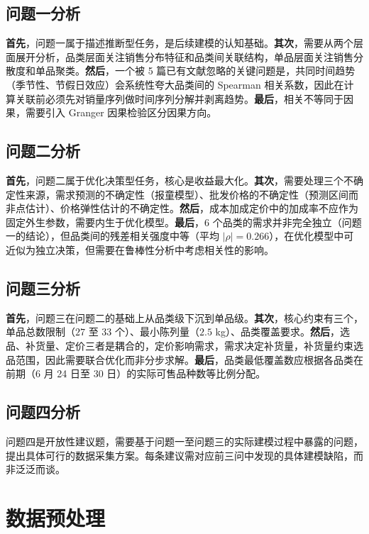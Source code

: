 \subsection{问题一分析}

\textbf{首先}，问题一属于描述推断型任务，是后续建模的认知基础。\textbf{其次}，需要从两个层面展开分析，品类层面关注销售分布特征和品类间关联结构，单品层面关注销售分散度和单品聚类。\textbf{然后}，一个被 5 篇已有文献忽略的关键问题是，共同时间趋势（季节性、节假日效应）会系统性夸大品类间的 Spearman 相关系数，因此在计算关联前必须先对销量序列做时间序列分解并剥离趋势。\textbf{最后}，相关不等同于因果，需要引入 Granger 因果检验区分因果方向。

\subsection{问题二分析}

\textbf{首先}，问题二属于优化决策型任务，核心是收益最大化。\textbf{其次}，需要处理三个不确定性来源，需求预测的不确定性（报童模型）、批发价格的不确定性（预测区间而非点估计）、价格弹性估计的不确定性。\textbf{然后}，成本加成定价中的加成率不应作为固定外生参数，需要内生于优化模型。\textbf{最后}，6 个品类的需求并非完全独立（问题一的结论），但品类间的残差相关强度中等（平均 $|\rho|=0.266$），在优化模型中可近似为独立决策，但需要在鲁棒性分析中考虑相关性的影响。

\subsection{问题三分析}

\textbf{首先}，问题三在问题二的基础上从品类级下沉到单品级。\textbf{其次}，核心约束有三个，单品总数限制（$27$ 至 $33$ 个）、最小陈列量（$2.5$ kg）、品类覆盖要求。\textbf{然后}，选品、补货量、定价三者是耦合的，定价影响需求，需求决定补货量，补货量约束选品范围，因此需要联合优化而非分步求解。\textbf{最后}，品类最低覆盖数应根据各品类在前期（6 月 24 日至 30 日）的实际可售品种数等比例分配。

\subsection{问题四分析}

问题四是开放性建议题，需要基于问题一至问题三的实际建模过程中暴露的问题，提出具体可行的数据采集方案。每条建议需对应前三问中发现的具体建模缺陷，而非泛泛而谈。

\section{数据预处理}

